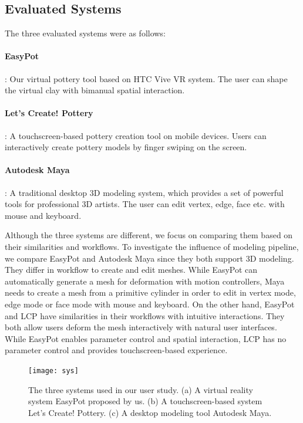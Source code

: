 \documentclass{svjour3}                     %
\begin{document}
\subsection{Evaluated Systems}
\label{sec:6.1}
The three evaluated systems were as follows:

\paragraph{EasyPot}: Our virtual pottery tool based on HTC Vive VR system. The user can shape the virtual clay with bimanual spatial interaction.
\paragraph{Let’s Create! Pottery}: A touchscreen-based pottery creation tool on mobile devices. Users can interactively create pottery models by finger swiping on the screen.
\paragraph{Autodesk Maya}: A traditional desktop 3D modeling system, which provides a set of powerful tools for professional 3D artists. The user can edit vertex, edge, face etc. with mouse and keyboard.

Although the three systems are different, we focus on comparing them based on their similarities and workflows.
To investigate the influence of modeling pipeline, we compare EasyPot and Autodesk Maya since they both support 3D modeling. They differ in workflow to create and edit meshes. While EasyPot can automatically generate a mesh for deformation with motion controllers, Maya needs to create a mesh from a primitive cylinder in order to edit in vertex mode, edge mode or face mode with mouse and keyboard. 
On the other hand, EasyPot and LCP have similarities in their workflows with intuitive interactions. They both allow users deform the mesh interactively with natural user interfaces. While EasyPot enables parameter control and spatial interaction, LCP has no parameter control and provides touchscreen-based experience.
\begin{figure}
\texttt{[image: sys]}
\caption{The three systems used in our user study. (a) A virtual reality system EasyPot proposed by us. (b) A touchscreen-based system Let's Create! Pottery. (c) A desktop modeling tool Autodesk Maya.}
\label{fig:sys}
\end{figure}
\end{document}
